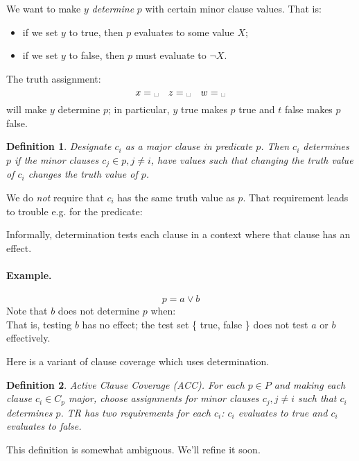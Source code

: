 \documentclass[11pt]{article}
\newtheorem{defn}{Definition}
\begin{document}
We want to make $y$ \emph{determine} $p$ with certain minor clause
values. That is:
\begin{itemize}
\item if we set $y$ to {\sf true}, then $p$ evaluates to some value $X$;
\item if we set $y$ to {\sf false}, then $p$ must evaluate to $\neg X$.
\end{itemize}

The truth assignment:
\[ x = \mbox{\textvisiblespace} \quad z = \mbox{\textvisiblespace} \quad w = \mbox{\textvisiblespace} \]
will make $y$ determine $p$; in particular, $y$ {\sf true} makes $p$
{\sf true} and $t$ {\sf false} makes $p$ {\sf false}.

\begin{defn}
Designate $c_i$ as a major clause in predicate $p$. Then $c_i$ 
\emph{determines} $p$ if the minor clauses $c_j \in p, j \neq i$, have
values such that changing the truth value of $c_i$ changes the truth value
of $p$.
\end{defn}

We do \emph{not} require that $c_i$ has the same truth value as $p$.
{\sf That requirement leads to trouble e.g. for the predicate: }

Informally, determination tests each clause in a context where that
clause has an effect.

\paragraph{Example.}
\[ p = a \vee b \]
{\sf Note that $b$ does not determine $p$ when:}\\[1em]

That is, testing $b$ has no effect; the test set {\sf \{ true, false
  \} } does not test $a$ or $b$ effectively.

Here is a variant of clause coverage which uses determination.
\begin{defn}
Active Clause Coverage (ACC). For each $p \in P$ and making each
clause $c_i \in C_p$ major, choose assignments for minor clauses $c_j,
j \neq i$ such that $c_i$ determines $p$. TR has two requirements for each
$c_i$: $c_i$ evaluates to true and $c_i$ evaluates to false.
\end{defn}
This definition is somewhat ambiguous. We'll refine it soon.
\end{document}
